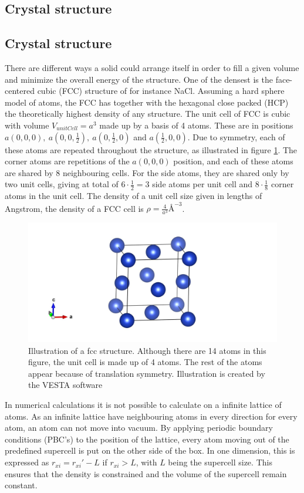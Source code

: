 
\subsection{Crystal structure}

\subsection{Crystal structure}

There are different ways a solid could arrange itself in order to fill a given volume and minimize the overall energy of the structure. One of the densest is the face-centered cubic (FCC) structure of for instance NaCl. Assuming a hard sphere model of atoms, the FCC has together with the hexagonal close packed (HCP) the theoretically highest density of any structure. The unit cell of FCC is cubic with volume $ V_{unitCell} = a^3 $ made up by a basis of 4 atoms. These are in positions $ a(0,0,0), \ a(0,0,\frac{1}{2}),\ a(0,\frac{1}{2}, 0)   $ and $ a(\frac{1}{2}, 0,0) $. Due to symmetry, each of these atoms are repeated throughout the structure, as illustrated in figure \ref{fig:fcc}. The corner atoms are  repetitions of the $ a(0,0,0)$ position, and each of these atoms are shared by 8 neighbouring cells. For the side atoms, they are shared only by two unit cells, giving at total of $ 6\cdot \frac{1}{2}=3 $ side atoms per unit cell and $ 8\cdot  \frac{1}{8}$ corner atoms in the unit cell. The density of a unit cell size given in lengths of Angstrom, the density of a FCC cell  is $\rho=  \frac{4}{a^3} \text{\AA}^{-3}$. 

\begin{figure}[H]
	\centering
	\includegraphics[width=0.7\linewidth]{../figures/fcc.jpg}
	\caption{Illustration of a fcc structure. Although there are 14 atoms in this figure, the unit cell is made up of 4 atoms. The rest of the atoms appear because of translation symmetry. Illustration is created by the VESTA software \cite{VESTA}}
	\label{fig:fcc}
\end{figure}

In numerical calculations it is not possible to calculate on a infinite lattice of atoms. As an infinite lattice have neighbouring atoms in every direction for every atom, an atom can not move into vacuum. By applying periodic boundary conditions (PBC's) to the position of the lattice, every atom moving out of the predefined supercell is put on the other side of the box. In one dimension, this is expressed as $ r_{xi} = r_{xi}' - L $ if $ r_{xi} >L $, with $ L $ being the supercell size. This ensures that the density is constrained and the volume of the supercell remain constant. 

